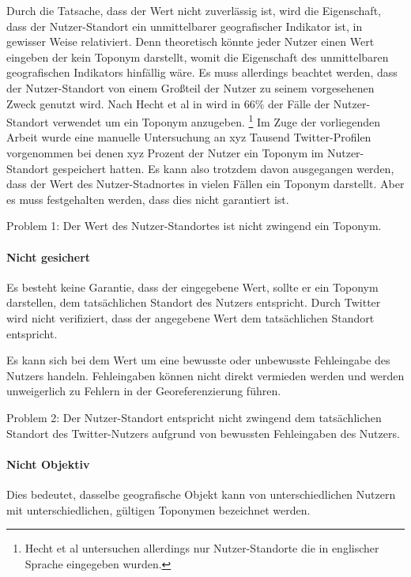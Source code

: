 				Durch die Tatsache, dass der Wert nicht zuverlässig ist, wird die Eigenschaft, dass der Nutzer-Standort ein unmittelbarer geografischer Indikator ist, in gewisser Weise relativiert.
				Denn theoretisch könnte jeder Nutzer einen Wert eingeben der kein Toponym darstellt, womit die Eigenschaft des unmittelbaren geografischen Indikators hinfällig wäre.
				Es muss allerdings beachtet werden, dass der Nutzer-Standort von einem Großteil der Nutzer zu seinem vorgesehenen Zweck genutzt wird.
				Nach Hecht et al in \cite{Hecht2011} wird in 66\%  der Fälle der Nutzer-Standort verwendet um ein Toponym anzugeben. \footnote{Hecht et al untersuchen allerdings nur Nutzer-Standorte die in englischer Sprache eingegeben wurden.}
				Im Zuge der vorliegenden Arbeit wurde eine manuelle Untersuchung an xyz Tausend Twitter-Profilen vorgenommen bei denen xyz Prozent der Nutzer ein Toponym im Nutzer-Standort gespeichert hatten.
				Es kann also trotzdem davon ausgegangen werden, dass der Wert des Nutzer-Stadnortes in vielen Fällen ein Toponym darstellt. 
				Aber es muss festgehalten werden, dass dies nicht garantiert ist.

				Problem 1: Der Wert des Nutzer-Standortes ist nicht zwingend ein Toponym.

			\paragraph{Nicht gesichert} 

				Es besteht keine Garantie, dass der eingegebene Wert, sollte er ein Toponym darstellen, dem tatsächlichen Standort des Nutzers entspricht. 
				Durch Twitter wird nicht verifiziert, dass der angegebene Wert dem tatsächlichen Standort entspricht.
				
				Es kann sich bei dem Wert um eine bewusste oder unbewusste Fehleingabe des Nutzers handeln.
				Fehleingaben können nicht direkt vermieden werden und werden unweigerlich zu Fehlern in der Georeferenzierung führen. 

				Problem 2: Der Nutzer-Standort entspricht nicht zwingend dem tatsächlichen Standort des Twitter-Nutzers aufgrund von bewussten Fehleingaben des Nutzers.

			\paragraph{Nicht Objektiv} 

				Dies bedeutet, dasselbe geografische Objekt kann von unterschiedlichen Nutzern mit unterschiedlichen, gültigen Toponymen bezeichnet werden. 
				
